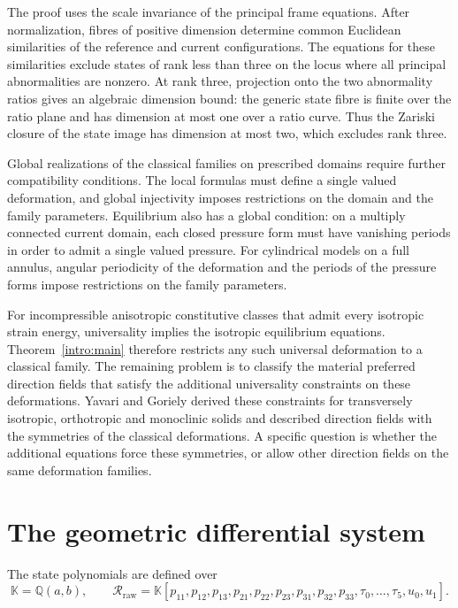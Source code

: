 \documentclass[11pt,a4paper]{article}
\numberwithin{equation}{section}
\theoremstyle{plain}
\theoremstyle{definition}
\theoremstyle{remark}
\begin{document}
The proof uses the scale invariance of the principal frame equations.
After normalization, fibres of positive dimension determine common
Euclidean similarities of the reference and current configurations.
The equations for these similarities exclude states of rank less
than three on the locus where all principal abnormalities are nonzero.
At rank three, projection onto the two abnormality ratios gives an
algebraic dimension bound: the generic state fibre is finite over the
ratio plane and has dimension at most one over a ratio curve.
Thus the Zariski closure of the state image has dimension at most two,
which excludes rank three.

Global realizations of the classical families on prescribed domains
require further compatibility conditions. The local formulas must
define a single valued deformation, and global injectivity imposes
restrictions on the domain and the family parameters. Equilibrium also
has a global condition: on a multiply connected current domain, each
closed pressure form must have vanishing periods in order to admit a
single valued pressure. For cylindrical models on a full annulus, angular periodicity of the
deformation and the periods of the pressure forms impose restrictions
on the family parameters.

For incompressible anisotropic constitutive classes that admit every
isotropic strain energy, universality implies the isotropic equilibrium
equations.
Theorem~\ref{intro:main} therefore restricts any such universal
deformation to a classical family. The remaining problem is
to classify the material preferred direction fields that satisfy the
additional universality constraints on these deformations. Yavari and
Goriely \cite{YavariGoriely2021} derived these constraints for
transversely isotropic, orthotropic and monoclinic solids and described
direction fields with the symmetries of the classical deformations.
A specific question is whether the additional equations force these
symmetries, or allow other direction fields on the same deformation
families.

\appendix
\section{The geometric differential system}
\label{appf:section}

The state polynomials are defined over
\[
 \mathbb K=\mathbb Q(a,b),\qquad
 \mathscr R_{\mathrm{raw}}=\mathbb K[p_{11},p_{12},p_{13},p_{21},p_{22},p_{23},
 p_{31},p_{32},p_{33},\tau_0,\ldots,\tau_5,u_0,u_1].
\]
\end{document}
